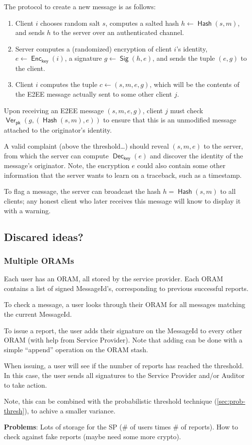 \documentclass[letterpaper,12pt]{article}
\DeclareMathOperator{\Hash}{\textsf{Hash}}
\DeclareMathOperator{\Enc}{\textsf{Enc}}
\DeclareMathOperator{\Dec}{\textsf{Dec}}
\DeclareMathOperator{\Sig}{\textsf{Sig}}
\DeclareMathOperator{\Ver}{\textsf{Ver}}
\newcommand{\pubkeyserv}{\textsf{pk}}
\newcommand{\symkeyserv}{\textsf{key}}
\begin{document}
The protocol to create a new message
is as follows:

\begin{enumerate}
  \item Client $i$ chooses random salt $s$, computes a salted hash $h \gets \Hash(s,m)$,
    and sends $h$ to the server over an authenticated channel.
  \item Server computes a (randomized) encryption of client $i$'s
    identity, $e \gets \Enc_\symkeyserv(i)$, a signature
    $g \gets \Sig(h, e)$,
    and sends the tuple $(e, g)$ to the client.
  \item Client $i$ computes the tuple $c \gets (s,m,e,g)$, which will be
    the contents of the E2EE message actually sent to some other client
    $j$.
\end{enumerate}

Upon receiving an E2EE message $(s,m,e,g)$, client $j$ must check
$\Ver_\pubkeyserv(g,(\Hash(s,m),e))$ to ensure that this is an
unmodified message attached to the originator's identity.

A valid complaint (above the threshold\ldots) should reveal $(s,m,e)$ to
the server, from which the server can compute $\Dec_\symkeyserv(e)$ and
discover the identity of the message's originator. Note, the encryption
$e$ could also contain some other information that the server wants to
learn on a traceback, such as a timestamp.

To flag a message, the server can broadcast the hash $h=\Hash(s,m)$ to
all clients; any honest client who later receives this message will know
to display it with a warning.

\subsection{Discared ideas?}

\subsubsection{Multiple ORAMs}

Each user has an ORAM, all stored by the service provider. Each ORAM
contains a list of signed MessageId's, corresponding to previous
successful reports.

To check a message, a user looks through their ORAM for all messages
matching the current MessageId.

To issue a report, the user adds their signature on the MessageId to
every other ORAM (with help from Service Provider). Note that adding can
be done with a simple ``append'' operation on the ORAM stash.

When issuing, a user will see if the number of reports has reached the
threshold. In this case, the user sends all signatures to the Service
Provider and/or Auditor to take action.

Note, this can be combined with the probabilistic threshold technique
(\cref{sec:prob-thresh}), to achive a smaller variance.

\textbf{Problems}: Lots of storage for the SP (\# of users times \# of
reports). How to check against fake reports (maybe need some more
crypto).





\end{document}
